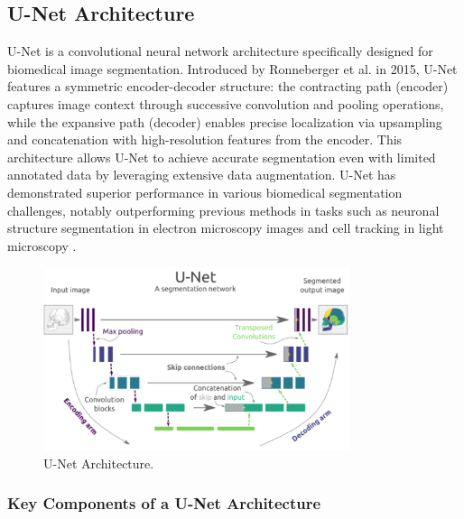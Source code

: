 \subsection{U-Net Architecture}
U-Net is a convolutional neural network architecture specifically designed for biomedical image segmentation. Introduced by Ronneberger et al. in 2015, U-Net features a symmetric encoder-decoder structure: the contracting path (encoder) captures image context through successive convolution and pooling operations, while the expansive path (decoder) enables precise localization via upsampling and concatenation with high-resolution features from the encoder. This architecture allows U-Net to achieve accurate segmentation even with limited annotated data by leveraging extensive data augmentation. U-Net has demonstrated superior performance in various biomedical segmentation challenges, notably outperforming previous methods in tasks such as neuronal structure segmentation in electron microscopy images and cell tracking in light microscopy \cite{ronneberger2015u}.

\begin{figure}[H]
  \centering
  \includegraphics[width=0.8\textwidth]{Images/Chapter1/unet2.png}
  \caption{U-Net Architecture.}
  \label{fig:unet}
\end{figure}

\subsubsection{Key Components of a U-Net Architecture}


